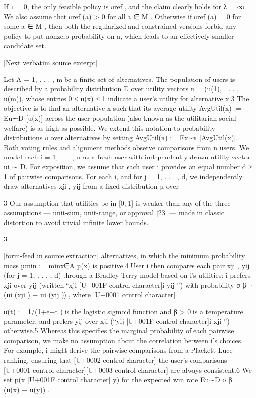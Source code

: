 \documentclass[10pt]{article}
\begin{document}
\begin{ReviewVerbatim}

      If τ = 0, the only feasible policy is πref , and the claim clearly holds for λ = ∞. We also assume that
πref (a) > 0 for all a ∈ M . Otherwise if πref (a) = 0 for some a ∈ M , then both the regularized and constrained
versions forbid any policy to put nonzero probability on a, which leads to an effectively smaller candidate set.

[Next verbatim source excerpt]

Let A = {1, . . . , m} be a finite set of alternatives. The population of users is described by a
probability distribution D over utility vectors u = (u(1), . . . , u(m)), whose entries 0 ≤ u(x) ≤ 1
indicate a user’s utility for alternative x.3 The objective is to find an alternative x such that its average
utility AvgUtil(x) := Eu∼D [u(x)] across the user population (also known as the utilitarian social
welfare) is as high as possible. We extend this notation to probability distributions π over alternatives
by setting AvgUtil(π) := Ex∼π [AvgUtil(x)].
Both voting rules and alignment methods observe comparisons from n users. We model each
i = 1, . . . , n as a fresh user with independently drawn utility vector ui ∼ D. For exposition, we
assume that each user i provides an equal number d ≥ 1 of pairwise comparisons. For each i,
and for j = 1, . . . , d, we independently draw alternatives xji , yij from a fixed distribution µ over

    3
     Our assumption that utilities be in [0, 1] is weaker than any of the three assumptions — unit-sum, unit-range,
or approval [23] — made in classic distortion to avoid trivial infinite lower bounds.


                                                           3

[form-feed in source extraction]
alternatives, in which the minimum probability mass µmin := minx∈A µ(x) is positive.4 User i
then compares each pair {xji , yij } (for j = 1, . . . , d) through a Bradley-Terry model based on i’s
utilities: i prefers xji over yij (written “xji [U+001F control character]i yij ”) with probability σ β · (ui (xji ) − ui (yij )) , where
                                                                                                        [U+0001 control character]

σ(t) := 1/(1+e−t ) is the logistic sigmoid function and β > 0 is a temperature parameter, and prefers
yij over xji (“yij [U+001F control character]i xji ”) otherwise.5 Whereas this specifies the marginal probability of each pairwise
comparison, we make no assumption about the correlation between i’s choices. For example, i might
derive the pairwise comparisons from a Plackett-Luce ranking, ensuring that      [U+0002 control character] the user’s comparisons  [U+0001 control character][U+0003 control character]
are always consistent.6 We set p(x [U+001F control character] y) for the expected win rate Eu∼D σ β · (u(x) − u(y)) .


\end{ReviewVerbatim}
\end{document}
